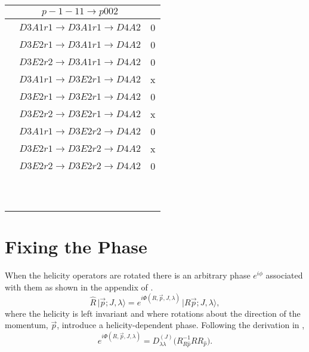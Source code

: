 \documentclass[10pt]{article}
\begin{document}
\begin{table}[!htbp]
\begin{minipage}[!htbp]{0.33\textwidth}
\begin{tabular}{cc c}
 &$p-1-11 \rightarrow p002 $ \\ \hline
 & $D3A1 r1 \rightarrow D3A1 r1 \rightarrow D4A2$ & 0\\
 & $D3E2 r1 \rightarrow D3A1 r1 \rightarrow D4A2$ &  0\\
 & $D3E2 r2 \rightarrow D3A1 r1 \rightarrow D4A2$ &  0\\
 & $D3A1 r1 \rightarrow D3E2 r1 \rightarrow D4A2$ &  x\\
 & $D3E2 r1 \rightarrow D3E2 r1 \rightarrow D4A2$ &  0\\
 & $D3E2 r2 \rightarrow D3E2 r1 \rightarrow D4A2$ &  x\\
 & $D3A1 r1 \rightarrow D3E2 r2 \rightarrow D4A2$ &  0\\
 & $D3E2 r1 \rightarrow D3E2 r2 \rightarrow D4A2$ &  x\\
 & $D3E2 r2 \rightarrow D3E2 r2 \rightarrow D4A2$ &  0\\
 
 \hline

 &\\\hline\\\\\\\\\\\\\\\\\\\hline
 
\end{tabular}
\end{minipage}
\end{table}
 
\newpage
\section{Fixing the Phase}
When the helicity operators are rotated there is an arbitrary phase $e^{i\phi}$ associated with them as shown in the appendix of \cite{shultz}. 
\begin{equation}
\hat{R}\, \big| \vec{p}; J,\lambda \big\rangle = e^{i \Phi(R, \vec{p}, J, \lambda)}\, \big| R \vec{p}; J,\lambda \big\rangle,
\label{hel_phase}
\end{equation}
where the helicity is left invariant and where rotations about the direction of the momentum, $\vec{p}$, introduce a helicity-dependent phase. Following the derivation in \cite{shultz},
\begin{equation}
e^{i \Phi(R, \vec{p}, J, \lambda)} = D^{(J)}_{\lambda\lambda}\big(R^{-1}_{R\hat{p}} R  R_{\hat{p}} \big). \label{hel_phase_D}
\end{equation}
\end{document}
